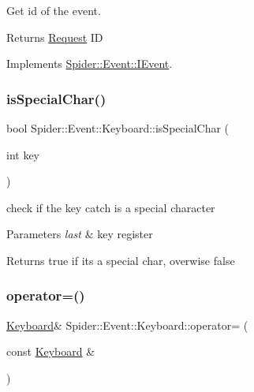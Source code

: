 Get id of the event. 

\begin{DoxyReturn}{Returns}
\hyperlink{class_spider_1_1_event_1_1_request}{Request} ID 
\end{DoxyReturn}


Implements \hyperlink{class_spider_1_1_event_1_1_i_event_a902d1376faa8e5948fa5bfe8d7208c88}{Spider\+::\+Event\+::\+I\+Event}.

\mbox{\label{class_spider_1_1_event_1_1_keyboard_a3d89487e20e8ad9f2d0889e0c57858e5}} 
\subsubsection{\texorpdfstring{is\+Special\+Char()}{isSpecialChar()}}
{\footnotesize\ttfamily bool Spider\+::\+Event\+::\+Keyboard\+::is\+Special\+Char (\begin{DoxyParamCaption}\item[{int}]{key }\end{DoxyParamCaption})}



check if the key catch is a special character 


\begin{DoxyParams}{Parameters}
{\em last} & key register \\
\hline
\end{DoxyParams}
\begin{DoxyReturn}{Returns}
true if it\textquotesingle{}s a special char, overwise false 
\end{DoxyReturn}
\mbox{\label{class_spider_1_1_event_1_1_keyboard_a4b6e022f756523104222e71d1d59fd54}} 
\subsubsection{\texorpdfstring{operator=()}{operator=()}}
{\footnotesize\ttfamily \hyperlink{class_spider_1_1_event_1_1_keyboard}{Keyboard}\& Spider\+::\+Event\+::\+Keyboard\+::operator= (\begin{DoxyParamCaption}\item[{const \hyperlink{class_spider_1_1_event_1_1_keyboard}{Keyboard} \&}]{ }\end{DoxyParamCaption})\hspace{0.3cm}{\ttfamily [delete]}}



